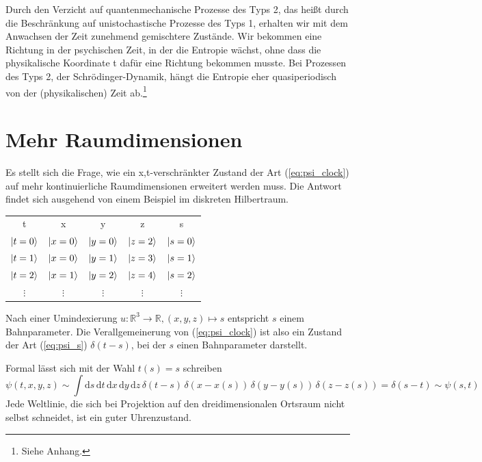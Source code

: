 \documentclass[12pt]{article}
\begin{document}
Durch den Verzicht auf quantenmechanische Prozesse des Typs 2, das heißt durch die Beschränkung auf unistochastische Prozesse des Typs 1, erhalten wir mit dem Anwachsen der Zeit zunehmend gemischtere Zustände. Wir bekommen eine Richtung in der psychischen Zeit, in der die Entropie wächst, ohne dass die physikalische Koordinate t dafür eine Richtung bekommen musste. Bei Prozessen des Typs 2, der Schrödinger-Dynamik, hängt die Entropie eher quasiperiodisch von der (physikalischen) Zeit ab.\footnote{Siehe Anhang.}

\section{Mehr Raumdimensionen}

Es stellt sich die Frage, wie ein x,t-verschränkter Zustand der Art (\ref{eq:psi_clock}) auf mehr kontinuierliche Raumdimensionen erweitert werden muss. Die Antwort findet sich ausgehend von einem Beispiel im diskreten Hilbertraum.
\begin{center}
\begin{tabular}{ |c|c|c|c|c| } 
 \hline
 t & x & y & z & s \\ 
 $\ket{t=0}$ & $\ket{x=0}$ & $\ket{y=0}$ & $\ket{z=2}$ & $\ket{s=0}$  \\
 $\ket{t=1}$ & $\ket{x=0}$ & $\ket{y=1}$ & $\ket{z=3}$ & $\ket{s=1}$  \\
 $\ket{t=2}$ & $\ket{x=1}$ & $\ket{y=2}$ & $\ket{z=4}$ & $\ket{s=2}$  \\
 $\vdots$ & $\vdots$ & $\vdots$ & $\vdots$ & $\vdots$ \\
 \hline
\end{tabular}
\end{center}
Nach einer Umindexierung $u: \mathbb{R}^3 \rightarrow \mathbb{R}, (x,y,z) \mapsto s$ entspricht $s$ einem Bahnparameter. Die Verallgemeinerung von (\ref{eq:psi_clock}) ist also ein Zustand der Art (\ref{eq:psi_s}) $\delta(t-s)$, bei der $s$ einen Bahnparameter darstellt.

Formal lässt sich mit der Wahl $t(s) = s$ schreiben
\begin{equation} 
\label{eq:psi_clock_3d_space}
\psi(t,x,y,z) \sim \int \mathrm ds \, \mathrm dt \, \mathrm dx \, \mathrm dy \, \mathrm dz \, \delta(t-s) \, \delta(x-x(s)) \, \delta(y-y(s)) \, \delta(z-z(s)) = \delta(s-t) \sim \psi(s,t)
\end{equation}
Jede Weltlinie, die sich bei Projektion auf den dreidimensionalen Ortsraum nicht selbst schneidet, ist ein guter Uhrenzustand. 
\end{document}
